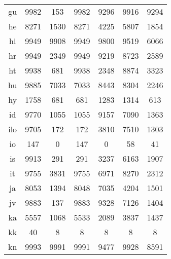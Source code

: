 \begin{figure}[h]
\begin{tabular}{ccccccc}
gu&9982&153&9982&9296&9916&9294\\
he&8271&1530&8271&4225&5807&1854\\
hi&9949&9908&9949&9800&9519&6066\\
hr&9949&2349&9949&9219&8723&2589\\
ht&9938&681&9938&2348&8874&3323\\
hu&9885&7033&7033&8443&8304&2246\\
hy&1758&681&681&1283&1314&613\\
id&9770&1055&1055&9157&7090&1363\\
ilo&9705&172&172&3810&7510&1303\\
io&147&0&147&0&58&41\\
is&9913&291&291&3237&6163&1907\\
it&9755&3831&9755&6971&8270&2312\\
ja&8053&1394&8048&7035&4204&1501\\
jv&9883&137&9883&9328&7126&1404\\
ka&5557&1068&5533&2089&3837&1437\\
kk&40&8&8&8&8&8\\
kn&9993&9991&9991&9477&9928&8591\\
\end{tabular}
\end{figure}
\clearpage
